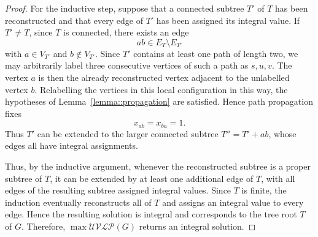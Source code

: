 \begin{proof}
  For the inductive step, suppose that a connected subtree $T'$ of $T$ has been reconstructed and that every edge of $T'$ has been assigned its integral value. If $T'\neq T$, since $T$ is connected, there exists an edge 
  \[ 
  ab \in E_T \setminus E_{T'} 
  \] 
  with $a \in V_{T'}$ and $b \notin V_{T'}$. Since $T'$ contains at least one path of length two, we may arbitrarily label three consecutive vertices of such a path as $s,u,v$. The vertex $a$ is then the already reconstructed vertex adjacent to the unlabelled vertex $b$. Relabelling the vertices in this local configuration in this way, the hypotheses of Lemma~\ref{lemma::propagation} are satisfied. Hence path propagation fixes 
  \[ 
  x_{ab}=x_{ba}=1. 
  \] 
  Thus $T'$ can be extended to the larger connected subtree $T''=T'+ab$, whose edges all have integral assignments. 
  
  Thus, by the inductive argument, whenever the reconstructed subtree is a proper subtree of $T$, it can be extended by at least one additional edge of $T$, with all edges of the resulting subtree assigned integral values. Since $T$ is finite, the induction eventually reconstructs all of $T$ and assigns an integral value to every edge. Hence the resulting solution is integral and corresponds to the tree root $T$ of $G$. Therefore, $\max\mathcal{UVLP}(G)$ returns an integral solution.
\end{proof}

